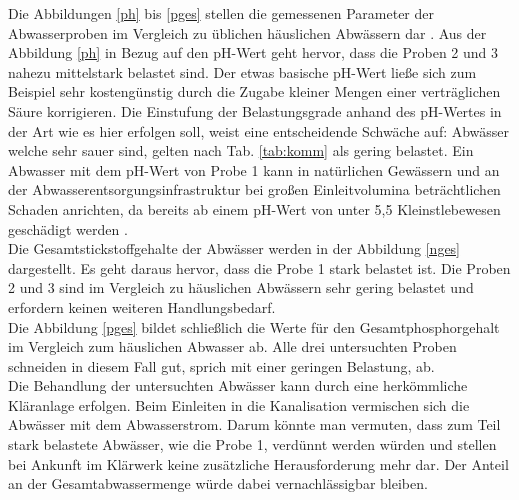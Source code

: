 Die Abbildungen \ref{ph} bis \ref{pges} stellen die gemessenen Parameter der Abwasserproben im Vergleich zu üblichen häuslichen Abwässern dar \cite[S. 29]{Skript}. Aus der Abbildung \ref{ph} in Bezug auf den pH-Wert geht hervor, dass die Proben 2 und 3 nahezu mittelstark belastet sind. Der etwas basische pH-Wert ließe sich zum Beispiel sehr kostengünstig durch die Zugabe kleiner Mengen einer verträglichen Säure korrigieren. Die Einstufung der Belastungsgrade anhand des pH-Wertes in der Art wie es hier erfolgen soll, weist eine entscheidende Schwäche auf:\linebreak
Abwässer welche sehr sauer sind, gelten nach Tab. \ref{tab:komm} als gering belastet. Ein Abwasser mit dem pH-Wert von Probe 1 kann in natürlichen Gewässern und an der Abwasserentsorgungsinfrastruktur bei großen Einleitvolumina beträchtlichen Schaden anrichten, da bereits ab einem pH-Wert von unter 5,5 Kleinstlebewesen geschädigt werden \cite{pHAbwasser}.\\
Die Gesamtstickstoffgehalte der Abwässer werden in der Abbildung \ref{nges} dargestellt. Es geht daraus hervor, dass die Probe 1 stark belastet ist. Die Proben 2 und 3 sind im Vergleich zu häuslichen Abwässern sehr gering belastet und erfordern keinen weiteren Handlungsbedarf.\\
Die Abbildung \ref{pges} bildet schließlich die Werte für den Gesamtphosphorgehalt im Vergleich zum häuslichen Abwasser ab. Alle drei untersuchten Proben schneiden in diesem Fall gut, sprich mit einer geringen Belastung, ab.\\

Die Behandlung der untersuchten Abwässer kann durch eine herkömmliche Kläranlage erfolgen. Beim Einleiten in die Kanalisation vermischen sich die Abwässer mit dem Abwasserstrom. Darum könnte man vermuten, dass zum Teil stark belastete Abwässer, wie die Probe 1, verdünnt werden würden und stellen bei Ankunft im Klärwerk keine zusätzliche Herausforderung mehr dar. Der Anteil an der Gesamtabwassermenge würde dabei vernachlässigbar bleiben. 

